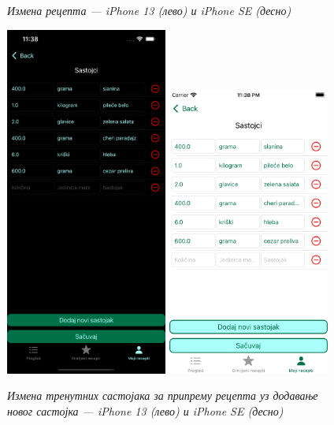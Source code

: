 \documentclass[12pt,oneside]{memoir}
\begin{document}
\begin{figure} [H]
    \caption{\textit{Измена рецепта --- iPhone 13 (лево) и iPhone SE (десно)}}
    \label{slika:измена_рецепта_1}
\end{figure}

\begin{figure} [H]
    \centering
    \captionsetup{justification=centering}
    \includegraphics[width=0.475\textwidth]{images/simulators/view images/dark - ingredients2.png}
    \hfill
    \includegraphics[width=0.475\textwidth]{images/simulators/view images/light - ingredients2.png}
    \caption{\textit{Измена тренутних састојака за припрему рецепта уз додавање новог састојка --- iPhone 13 (лево) и iPhone SE (десно)}}
    \label{slika:измена_састојака_2_1}
\end{figure}
\end{document}
